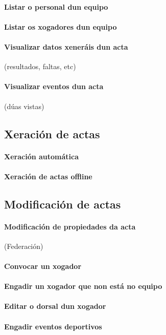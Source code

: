     \paragraph{Listar o personal dun equipo}
    \paragraph{Listar os xogadores dun equipo}
    \paragraph{Visualizar datos xeneráis dun acta} (resultados, faltas, etc)
    \paragraph{Visualizar eventos dun acta} (dúas vistas)

  \subsection{Xeración de actas}
    \paragraph{Xeración automática}
    \paragraph{Xeración de actas offline}

  \subsection{Modificación de actas}
    \paragraph{Modificación de propiedades da acta} (Federación)
    \paragraph{Convocar un xogador}
    \paragraph{Engadir un xogador que non está no equipo}
    \paragraph{Editar o dorsal dun xogador}
    \paragraph{Engadir eventos deportivos}
